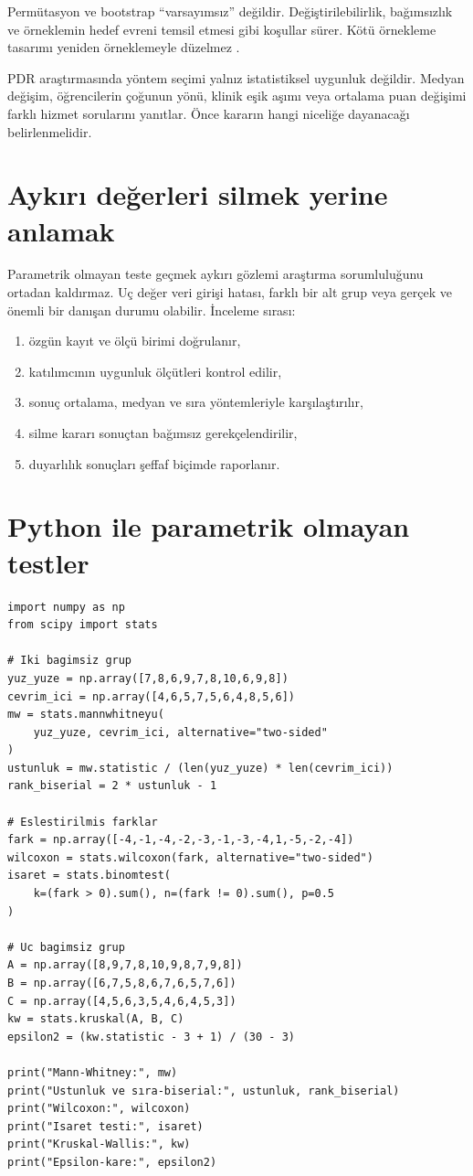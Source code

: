 Permütasyon ve bootstrap ``varsayımsız'' değildir. Değiştirilebilirlik,
bağımsızlık ve örneklemin hedef evreni temsil etmesi gibi koşullar sürer.
Kötü örnekleme tasarımı yeniden örneklemeyle düzelmez
\cite{efron1993,wasserman2006}.

\begin{researchbox}
PDR araştırmasında yöntem seçimi yalnız istatistiksel uygunluk değildir.
Medyan değişim, öğrencilerin çoğunun yönü, klinik eşik aşımı veya ortalama
puan değişimi farklı hizmet sorularını yanıtlar. Önce kararın hangi niceliğe
dayanacağı belirlenmelidir.
\end{researchbox}

\section{Aykırı değerleri silmek yerine anlamak}

Parametrik olmayan teste geçmek aykırı gözlemi araştırma sorumluluğunu ortadan
kaldırmaz. Uç değer veri girişi hatası, farklı bir alt grup veya gerçek ve
önemli bir danışan durumu olabilir. İnceleme sırası:

\begin{enumerate}
  \item özgün kayıt ve ölçü birimi doğrulanır,
  \item katılımcının uygunluk ölçütleri kontrol edilir,
  \item sonuç ortalama, medyan ve sıra yöntemleriyle karşılaştırılır,
  \item silme kararı sonuçtan bağımsız gerekçelendirilir,
  \item duyarlılık sonuçları şeffaf biçimde raporlanır.
\end{enumerate}

\section{Python ile parametrik olmayan testler}

\begin{lstlisting}
import numpy as np
from scipy import stats

# Iki bagimsiz grup
yuz_yuze = np.array([7,8,6,9,7,8,10,6,9,8])
cevrim_ici = np.array([4,6,5,7,5,6,4,8,5,6])
mw = stats.mannwhitneyu(
    yuz_yuze, cevrim_ici, alternative="two-sided"
)
ustunluk = mw.statistic / (len(yuz_yuze) * len(cevrim_ici))
rank_biserial = 2 * ustunluk - 1

# Eslestirilmis farklar
fark = np.array([-4,-1,-4,-2,-3,-1,-3,-4,1,-5,-2,-4])
wilcoxon = stats.wilcoxon(fark, alternative="two-sided")
isaret = stats.binomtest(
    k=(fark > 0).sum(), n=(fark != 0).sum(), p=0.5
)

# Uc bagimsiz grup
A = np.array([8,9,7,8,10,9,8,7,9,8])
B = np.array([6,7,5,8,6,7,6,5,7,6])
C = np.array([4,5,6,3,5,4,6,4,5,3])
kw = stats.kruskal(A, B, C)
epsilon2 = (kw.statistic - 3 + 1) / (30 - 3)

print("Mann-Whitney:", mw)
print("Ustunluk ve sıra-biserial:", ustunluk, rank_biserial)
print("Wilcoxon:", wilcoxon)
print("Isaret testi:", isaret)
print("Kruskal-Wallis:", kw)
print("Epsilon-kare:", epsilon2)
\end{lstlisting}

